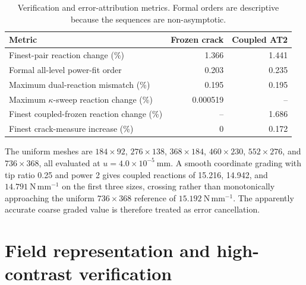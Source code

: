 \documentclass[review,12pt]{elsarticle}
\begin{document}
\begin{table}[!htbp]
\centering
\caption{Verification and error-attribution metrics. Formal orders are
descriptive because the sequences are non-asymptotic.}
\label{tab:S3}
\begin{tabular}{lrr}
\toprule
Metric & Frozen crack & Coupled AT2\\
\midrule
Finest-pair reaction change (\%) & 1.366 & 1.441\\
Formal all-level power-fit order & 0.203 & 0.235\\
Maximum dual-reaction mismatch (\%) & 0.195 & 0.195\\
Maximum $\kappa$-sweep reaction change (\%) & 0.000519 & --\\
Finest coupled-frozen reaction change (\%) & -- & 1.686\\
Finest crack-measure increase (\%) & 0 & 0.172\\
\bottomrule
\end{tabular}
\end{table}

The uniform meshes are $184\times92$, $276\times138$, $368\times184$,
$460\times230$, $552\times276$, and $736\times368$, all evaluated at
$u=4.0\times10^{-5}\ \mathrm{mm}$. A smooth coordinate grading with tip ratio 0.25 and
power 2 gives coupled reactions of 15.216, 14.942, and
$14.791~\mathrm{N\,mm^{-1}}$ on the first three sizes, crossing rather than
monotonically approaching the uniform $736\times368$ reference of
$15.192~\mathrm{N\,mm^{-1}}$. The apparently accurate coarse graded value is
therefore treated as error cancellation.

\section{Field representation and high-contrast verification}
\label{sec:supp-controls}

\begin{table}[!htbp]
\centering
\small
\caption{Paired grain-boundary-field contrasts and the auxiliary homogeneous
mesh comparison at each exact displacement. Effects are reported on the finest
common completed mesh for each case.}
\label{tab:S4}
\end{table}
\end{document}
